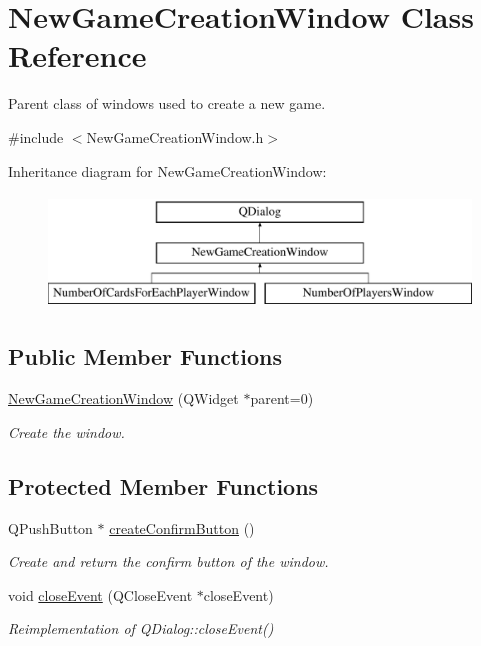 \hypertarget{classNewGameCreationWindow}{}\section{New\+Game\+Creation\+Window Class Reference}
\label{classNewGameCreationWindow}


Parent class of windows used to create a new game.  




{\ttfamily \#include $<$New\+Game\+Creation\+Window.\+h$>$}

Inheritance diagram for New\+Game\+Creation\+Window\+:\begin{figure}[H]
\begin{center}
\leavevmode
\includegraphics[height=3.000000cm]{classNewGameCreationWindow}
\end{center}
\end{figure}
\subsection*{Public Member Functions}
\begin{DoxyCompactItemize}
\item 
\hyperlink{classNewGameCreationWindow_a1b8cd9166289a086a951c2ee9d6bfebe}{New\+Game\+Creation\+Window} (Q\+Widget $\ast$parent=0)
\begin{DoxyCompactList}\small\item\em Create the window. \end{DoxyCompactList}\end{DoxyCompactItemize}
\subsection*{Protected Member Functions}
\begin{DoxyCompactItemize}
\item 
Q\+Push\+Button $\ast$ \hyperlink{classNewGameCreationWindow_aaa0b36302cf67c363da723e64c92c777}{create\+Confirm\+Button} ()
\begin{DoxyCompactList}\small\item\em Create and return the confirm button of the window. \end{DoxyCompactList}\item 
void \hyperlink{classNewGameCreationWindow_ad96277fa809e77e33ade1a93fc4af5d7}{close\+Event} (Q\+Close\+Event $\ast$close\+Event)
\begin{DoxyCompactList}\small\item\em Reimplementation of Q\+Dialog\+::close\+Event() \end{DoxyCompactList}\end{DoxyCompactItemize}
